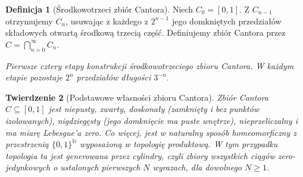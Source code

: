 \documentclass[11pt,a4paper,oneside]{book}
\numberwithin{equation}{chapter}
\theoremstyle{plain}
\newtheorem{twierdzenie}{Twierdzenie}[chapter]
\theoremstyle{definition}
\newtheorem{definicja}[twierdzenie]{Definicja}
\theoremstyle{remark}
\begin{document}
\begin{definicja}[Środkowotrzeci zbiór Cantora]
\label{def:cantor-set}
Niech $C_0=[0,1]$. Z $C_{n-1}$ otrzymujemy $C_n$,
usuwając z każdego z $2^{n-1}$ jego domkniętych
przedziałów składowych otwartą środkową trzecią część.
Definiujemy zbiór Cantora przez
$C=\bigcap_{n=0}^\infty C_n$.
\end{definicja}

\begin{center}

\smallskip
\emph{Pierwsze cztery etapy konstrukcji środkowotrzeciego zbioru Cantora.
W każdym etapie pozostaje $2^n$ przedziałów długości $3^{-n}$.}
\end{center}

\begin{twierdzenie}[Podstawowe własności zbioru Cantora]
\label{thm:cantor-properties}
Zbiór Cantora $C\subseteq[0,1]$ jest niepusty, zwarty,
doskonały (zamknięty i bez punktów izolowanych),
nigdziegęsty (jego domknięcie ma puste wnętrze),
nieprzeliczalny i ma miarę Lebesgue'a zero.
Co więcej, jest w naturalny sposób homeomorficzny
z przestrzenią $\{0,1\}^{\mathbb N}$ wyposażoną
w topologię produktową. W tym przypadku topologia ta
jest generowana przez cylindry, czyli zbiory wszystkich
ciągów zero-jedynkowych o ustalonych pierwszych
$N$ wyrazach, dla dowolnego $N\ge1$.
\end{twierdzenie}
\end{document}
